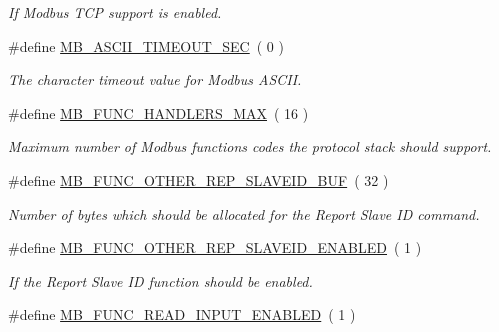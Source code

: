 \begin{DoxyCompactItemize}
\begin{DoxyCompactList}\small\item\em If Modbus T\+CP support is enabled. \end{DoxyCompactList}\item 
\#define \hyperlink{group__modbus__cfg_ga90fe92ab8f17c76c6e48dbbab8986446}{M\+B\+\_\+\+A\+S\+C\+I\+I\+\_\+\+T\+I\+M\+E\+O\+U\+T\+\_\+\+S\+EC}~(  0 )
\begin{DoxyCompactList}\small\item\em The character timeout value for Modbus A\+S\+C\+II. \end{DoxyCompactList}\item 
\#define \hyperlink{group__modbus__cfg_ga1dd115d6338ef87c83aaa23809792f25}{M\+B\+\_\+\+F\+U\+N\+C\+\_\+\+H\+A\+N\+D\+L\+E\+R\+S\+\_\+\+M\+AX}~( 16 )
\begin{DoxyCompactList}\small\item\em Maximum number of Modbus functions codes the protocol stack should support. \end{DoxyCompactList}\item 
\#define \hyperlink{group__modbus__cfg_ga4c376ec5ec8bea2ccfe067cd8c05db06}{M\+B\+\_\+\+F\+U\+N\+C\+\_\+\+O\+T\+H\+E\+R\+\_\+\+R\+E\+P\+\_\+\+S\+L\+A\+V\+E\+I\+D\+\_\+\+B\+UF}~( 32 )
\begin{DoxyCompactList}\small\item\em Number of bytes which should be allocated for the {\itshape Report Slave ID }command. \end{DoxyCompactList}\item 
\#define \hyperlink{group__modbus__cfg_ga580ff483eb8b3fbfc23115808d7025c9}{M\+B\+\_\+\+F\+U\+N\+C\+\_\+\+O\+T\+H\+E\+R\+\_\+\+R\+E\+P\+\_\+\+S\+L\+A\+V\+E\+I\+D\+\_\+\+E\+N\+A\+B\+L\+ED}~(  1 )\hypertarget{group__modbus__cfg_ga580ff483eb8b3fbfc23115808d7025c9}{}\label{group__modbus__cfg_ga580ff483eb8b3fbfc23115808d7025c9}

\begin{DoxyCompactList}\small\item\em If the {\itshape Report Slave ID} function should be enabled. \end{DoxyCompactList}\item 
\#define \hyperlink{group__modbus__cfg_ga18432b6043942aa4b9e5f14c0543e663}{M\+B\+\_\+\+F\+U\+N\+C\+\_\+\+R\+E\+A\+D\+\_\+\+I\+N\+P\+U\+T\+\_\+\+E\+N\+A\+B\+L\+ED}~(  1 )\hypertarget{group__modbus__cfg_ga18432b6043942aa4b9e5f14c0543e663}{}\label{group__modbus__cfg_ga18432b6043942aa4b9e5f14c0543e663}


\end{DoxyCompactItemize}
